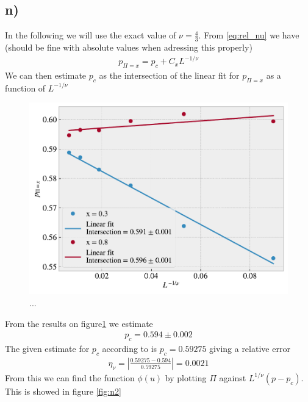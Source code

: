 \documentclass[reprint, amsmath, amssymb, aps]{revtex4-2}
\begin{document}
\subsection*{n)}
In the following we will use the exact value of $\nu = \frac{4}{3}$. From \ref{eq:rel_nu} we have (should be fine with absolute values when adressing this properly)
\begin{align*}
  p_{\Pi=x} = p_c + C_xL^{-1/\nu}
\end{align*}
We can then estimate $p_c$ as the intersection of the linear fit for $p_{\Pi=x}$ as a function of $L^{-1/\nu}$
\begin{figure}[H]
  \includegraphics[width=\linewidth]{figures/n.pdf}
  \caption{...}
  \label{fig:n}
\end{figure}
From the results on figure\ref{fig:n} we estimate
\begin{align*}
  p_c = 0.594 \pm 0.002
\end{align*}
The given estimate for $p_c$ according to \cite{textbook} is $p_c = 0.59275$ giving a relative error
\begin{align*}
  \eta_\nu= \left|\frac{0.59275 - 0.594}{0.59275}\right| = 0.0021
\end{align*}
From this we can find the function $\phi(u)$ by plotting $\Pi$ against $L^{1/\nu}(p-p_c)$. This is showed in figure \ref{fig:n2}
\end{document}
